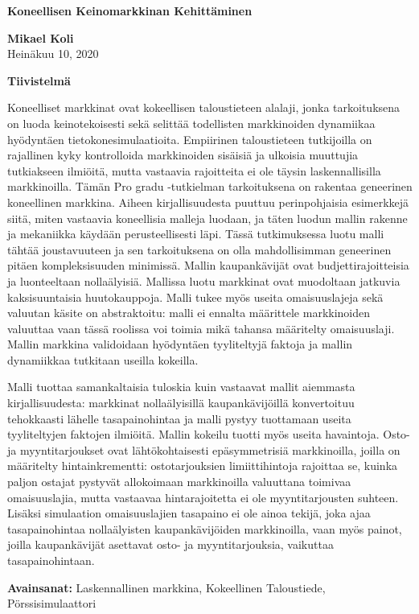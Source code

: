

\thispagestyle{plain}
\begin{center}
    \Large
    \textbf{Koneellisen Keinomarkkinan Kehitt\"aminen}
        
    \vspace{0.4cm}
    \large
        
    \vspace{0.4cm}
    \textbf{Mikael Koli} \\
    Heinäkuu 10, 2020 %
       
    \vspace{0.9cm}
    \textbf{Tiivistelmä}
\end{center}

Koneelliset markkinat ovat kokeellisen taloustieteen alalaji, jonka tarkoituksena
on luoda keinotekoisesti sekä selittää todellisten markkinoiden dynamiikaa hyödyntäen
tietokonesimulaatioita. Empiirinen taloustieteen tutkijoilla on rajallinen kyky kontrolloida
markkinoiden sisäisiä ja ulkoisia muuttujia tutkiakseen ilmiöitä, mutta vastaavia rajoitteita
ei ole täysin laskennallisilla markkinoilla. Tämän Pro gradu -tutkielman tarkoituksena on rakentaa
geneerinen koneellinen markkina. Aiheen kirjallisuudesta puuttuu perinpohjaisia esimerkkejä siitä,
miten vastaavia koneellisia malleja luodaan, ja täten luodun mallin rakenne ja mekaniikka käydään
perusteellisesti läpi. Tässä tutkimuksessa luotu malli tähtää joustavuuteen ja sen tarkoituksena on
olla mahdollisimman geneerinen pitäen kompleksisuuden minimissä. Mallin kaupankävijät ovat budjettirajoitteisia
ja luonteeltaan nollaälyisiä. Mallissa luotu markkinat ovat muodoltaan jatkuvia
kaksisuuntaisia huutokauppoja. Malli tukee myös useita omaisuuslajeja sekä valuutan käsite on abstraktoitu: 
malli ei ennalta määrittele markkinoiden valuuttaa vaan tässä roolissa voi toimia mikä tahansa määritelty
omaisuuslaji. Mallin markkina validoidaan hyödyntäen tyyliteltyjä faktoja ja mallin dynamiikkaa
tutkitaan useilla kokeilla.

Malli tuottaa samankaltaisia tuloskia kuin vastaavat mallit aiemmasta kirjallisuudesta: markkinat nollaälyisillä
kaupankävijöillä konvertoituu tehokkaasti lähelle tasapainohintaa ja malli pystyy tuottamaan useita tyyliteltyjen 
faktojen ilmiöitä. Mallin kokeilu tuotti myös useita havaintoja. Osto- ja myyntitarjoukset ovat lähtökohtaisesti 
epäsymmetrisiä markkinoilla, joilla on määritelty hintainkrementti: ostotarjouksien limiittihintoja rajoittaa 
se, kuinka paljon ostajat pystyvät allokoimaan markkinoilla valuuttana toimivaa omaisuuslajia, mutta vastaavaa 
hintarajoitetta ei ole myyntitarjousten suhteen. Lisäksi simulaation omaisuuslajien tasapaino ei ole ainoa tekijä,
joka ajaa tasapainohintaa nollaälyisten kaupankävijöiden markkinoilla, vaan myös painot, joilla kaupankävijät 
asettavat osto- ja myyntitarjouksia, vaikuttaa tasapainohintaan.

\textbf{Avainsanat:} Laskennallinen markkina, Kokeellinen Taloustiede, Pörssisimulaattori